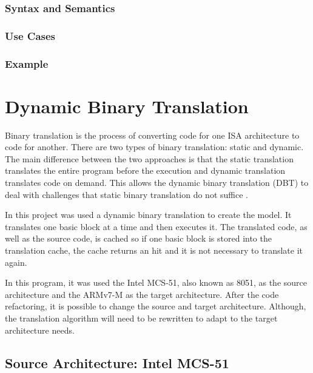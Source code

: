 \documentclass{report}
\begin{document}
			\subsubsection{Syntax and Semantics}

			\subsubsection{Use Cases}

			\subsubsection{Example}

	\section{Dynamic Binary Translation}
	\par Binary translation is the process of converting code for one ISA architecture to code for another. There are two types of binary translation: static and dynamic. The main difference between the two approaches is that the static translation translates the entire program before the execution and dynamic translation translates code on demand. This allows the dynamic binary translation (DBT) to deal with challenges that static binary translation do not suffice \cite{b.hawkingsb.demskyd.brueningq.zhao2015}. 
	\par In this project was used a dynamic binary translation to create the model. It translates one basic block at a time and then executes it. The translated code, as well as the source code, is cached so if one basic block is stored into the translation cache, the cache returns an hit and it is not necessary to translate it again. 
	\par In this program, it was used the Intel MCS-51, also known as 8051, as the source architecture and the ARMv7-M as the target architecture. After the code refactoring, it is possible to change the source and target architecture. Although, the translation algorithm will need to be rewritten to adapt to the target architecture needs.
	
		\subsection{Source Architecture: Intel MCS-51}
		
\end{document}

